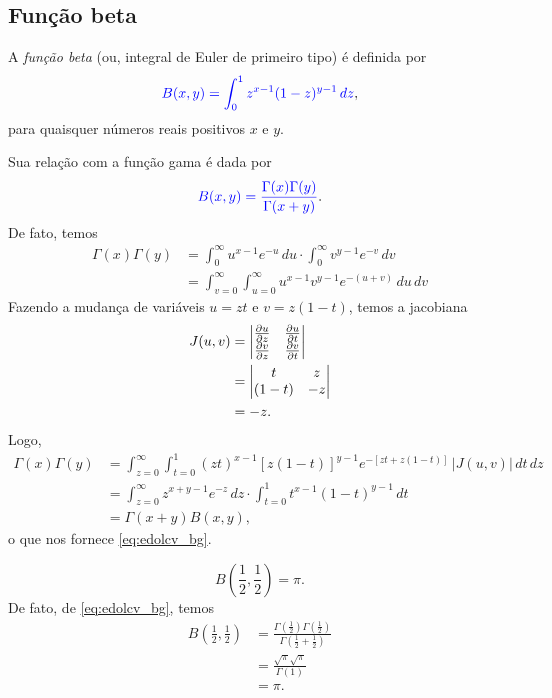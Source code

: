 \subsection{Função beta}

A \emph{função beta} (ou, integral de Euler de primeiro tipo) é definida por
\begin{equation}
  {\color{blue}B(x,y) = \int_0^1 z^{x-1}(1-z)^{y-1}\,dz},
\end{equation}
para quaisquer números reais positivos $x$ e $y$.

Sua relação com a função gama é dada por
\begin{equation}\label{eq:edolcv_bg}
  {\color{blue}B(x,y) = \frac{\Gamma(x)\Gamma(y)}{\Gamma(x+y)}}.
\end{equation}
De fato, temos
\begin{align}
  \Gamma(x)\Gamma(y) &= \int_0^\infty u^{x-1}e^{-u}\,du\cdot\int_0^\infty v^{y-1}e^{-v}\,dv \\
                     &= \int_{v=0}^\infty\int_{u=0}^\infty u^{x-1}v^{y-1}e^{-(u+v)}\,du\,dv
\end{align}
Fazendo a mudança de variáveis $u=zt$ e $v=z(1-t)$, temos a jacobiana
\begin{align}
  J(u,v) &=
           \begin{vmatrix}
             \frac{\partial u}{\partial z} & \frac{\partial u}{\partial t}\\
             \frac{\partial v}{\partial z} & \frac{\partial v}{\partial t}
           \end{vmatrix}\\
         &= \begin{vmatrix}
           t & z\\
           (1-t) & -z
         \end{vmatrix}\\
         &= -z.
\end{align}
Logo,
\begin{align}
  \Gamma(x)\Gamma(y) &= \int_{z=0}^\infty\int_{t=0}^1 (zt)^{x-1}[z(1-t)]^{y-1}e^{-[zt+z(1-t)]}\,|J(u,v)|\,dt\,dz\\
                     &= \int_{z=0}^\infty z^{x+y-1}e^{-z}\,dz\cdot \int_{t=0}^1 t^{x-1}(1-t)^{y-1}\,dt\\
                     &= \Gamma(x+y) B(x,y),
\end{align}
o que nos fornece \eqref{eq:edolcv_bg}.

\begin{ex}
  \begin{equation}
    B\left(\frac{1}{2}, \frac{1}{2}\right) = \pi.
  \end{equation}
  De fato, de \eqref{eq:edolcv_bg}, temos
  \begin{align}
    B\left(\frac{1}{2}, \frac{1}{2}\right) &= \frac{\Gamma\left(\frac{1}{2}\right)\Gamma\left(\frac{1}{2}\right)}{\Gamma\left(\frac{1}{2}+\frac{1}{2}\right)}\\
                                           &= \frac{\sqrt{\pi}\sqrt{\pi}}{\Gamma(1)}\\
                                           &= \pi.
  \end{align}
\end{ex}

